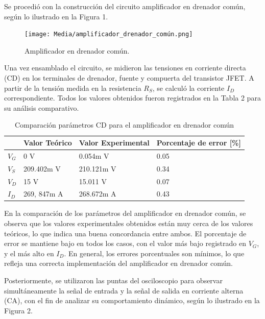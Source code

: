 \documentclass[journal]{IEEEtran}
\begin{document}
\par Se procedió con la construcción del circuito amplificador en drenador común, según lo ilustrado en la Figura 1. 
\begin{figure}[H]
    \centering
    \texttt{[image: Media/amplificador\_drenador\_común.png]}
    \caption{Amplificador en drenador común.}
    \label{fig:amplificador_drenador_común.}
\end{figure}
\par Una vez ensamblado el circuito, se midieron las tensiones en corriente directa (CD) en los terminales de drenador, fuente y compuerta del transistor JFET. A partir de la tensión medida en la resistencia \( R_S \), se calculó la corriente \( I_D \) correspondiente. Todos los valores obtenidos fueron registrados en la Tabla 2 para su análisis comparativo.
\begin{table}[h]
    \caption{Comparación parámetros CD para el amplificador en drenador común}
    \centering
    \renewcommand{\arraystretch}{1.2} %
    \begin{tabular}{|l|p{2cm}|p{2cm}|p{2cm}|}
        \hline
        & \textbf{Valor Teórico} & \textbf{Valor Experimental} & \textbf{Porcentaje de error [\%]} \\
        \hline
        \( V_G \) & 0 V  & 0.054m V  & 0.05 \\
        \hline
        \( V_S \) & 209.402m V   & 210.121m V  & 0.34 \\
        \hline
        \( V_D \) & 15 V & 15.011 V & 0.07 \\
        \hline
        \( I_D \) & 269, 847m A & 268.672m A & 0.43 \\
        \hline
    \end{tabular}
    \label{tab:resistencias}
\end{table}
\par En la comparación de los parámetros del amplificador en drenador común, se observa que los valores experimentales obtenidos están muy cerca de los valores teóricos, lo que indica una buena concordancia entre ambos. El porcentaje de error se mantiene bajo en todos los casos, con el valor más bajo registrado en \( V_G \), y el más alto en \( I_D \). En general, los errores porcentuales son mínimos, lo que refleja una correcta implementación del amplificador en drenador común.
\par Posteriormente, se utilizaron las puntas del osciloscopio para observar simultáneamente la señal de entrada y la señal de salida en corriente alterna (CA), con el fin de analizar su comportamiento dinámico, según lo ilustrado en la Figura 2. 
\end{document}
